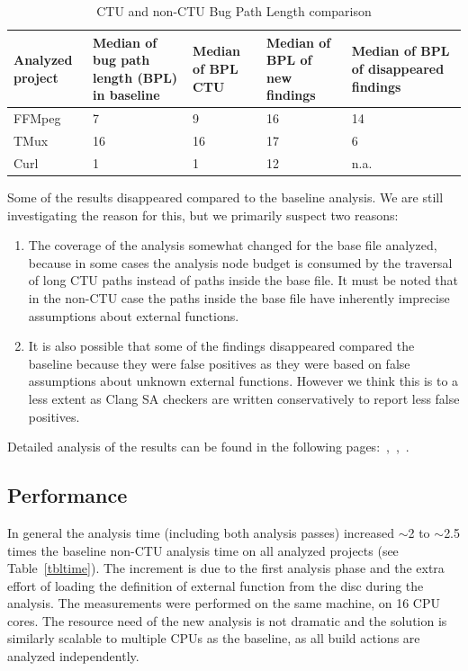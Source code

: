\documentclass{article}
\begin{document}
\begin {table}[h!]
\centering
\begin{tabular}{| C{2cm}|| C{2cm} | C{2cm} |C{2cm} |C{2cm} |}
  \hline
  Analyzed project & Median of bug path length (BPL) in baseline&Median of BPL CTU&Median of BPL of new findings&Median of BPL of disappeared findings\\
  \hline
  \hline
  FFMpeg&7&9&16&14\\
  \hline
  TMux&16&16&17&6\\
  \hline
  Curl& 1&1&12&n.a.\\
  \hline  
\end{tabular}
\caption{CTU and non-CTU Bug Path Length comparison}
\label{tblbpl}
\end{table}

Some of the results disappeared compared to the baseline analysis. 
We are still investigating the reason for this, but we primarily 
suspect two reasons:

\begin{enumerate}
  \item The coverage of the analysis somewhat changed for the base file
        analyzed, because in some cases the analysis node budget is consumed
        by the traversal of long CTU paths instead of paths inside the base
        file. It must be noted that in the non-CTU case the paths inside the
        base file have inherently imprecise assumptions about external
        functions.

  \item It is also possible that some of the findings disappeared
        compared the baseline because they were false positives as they were
        based on false assumptions about unknown external functions. However
        we think this is to a less extent as Clang SA checkers are written
        conservatively to report less false positives.
\end{enumerate}

Detailed analysis of the results can be found in the following
pages:~\cite{ffmpegres},~\cite{tmuxres},~\cite{curlres}.

\subsection{Performance}
In general the analysis time (including both analysis passes) 
increased $\sim$2 to $\sim$2.5 times the baseline non-CTU analysis time on all analyzed
projects (see Table~\ref{tbltime}). The increment is due to the first analysis phase and the extra effort
of loading the definition of external function from the disc during the
analysis. The measurements were performed on the same machine, on 16 CPU cores.
The resource need of the new analysis is not dramatic and the solution is
similarly scalable to multiple CPUs as the baseline, as all build actions
are analyzed independently.
\end{document}

